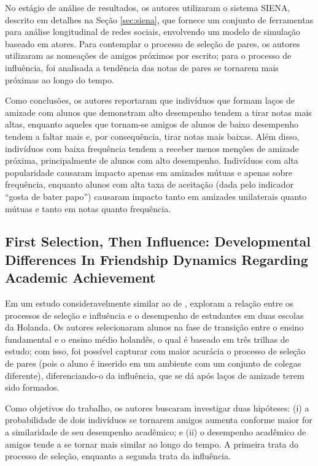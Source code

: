 No estágio de análise de resultados, os autores utilizaram o sistema SIENA, descrito em detalhes na Seção \ref{sec:siena}, que fornece um conjunto de ferramentas para análise longitudinal de redes sociais, envolvendo um modelo de simulação baseado em atores. Para contemplar o processo de seleção de pares, os autores utilizaram as nomeações de amigos próximos por escrito; para o processo de influência, foi analisada a tendência das notas de pares se tornarem mais próximas ao longo do tempo.

Como conclusões, os autores reportaram que indivíduos que formam laços de amizade com alunos que demonstram alto desempenho tendem a tirar notas mais altas, enquanto aqueles que tornam-se amigos de alunos de baixo desempenho tendem a faltar mais e, por consequência, tirar notas mais baixas. Além disso, indivíduos com baixa frequência tendem a receber menos menções de amizade próxima, principalmente de alunos com alto desempenho. Indivíduos com alta popularidade causaram impacto apenas em amizades mútuas e apenas sobre frequência, enquanto alunos com alta taxa de aceitação (dada pelo indicador ``gosta de bater papo'') causaram impacto tanto em amizades unilaterais quanto mútuas e tanto em notas quanto frequência.

\subsection{First Selection, Then Influence: Developmental Differences In Friendship Dynamics Regarding Academic Achievement} \label{sec:gremmen}

Em um estudo consideravelmente similar ao de ,  exploram a relação entre os processos de seleção e influência e o desempenho de estudantes em duas escolas da Holanda. Os autores selecionaram alunos na fase de transição entre o ensino fundamental e o ensino médio holandês, o qual é baseado em três trilhas de estudo; com isso, foi possível capturar com maior acurácia o processo de seleção de pares (pois o aluno é inserido em um ambiente com um conjunto de colegas diferente), diferenciando-o da influência, que se dá após laços de amizade terem sido formados.

Como objetivos do trabalho, os autores buscaram investigar duas hipóteses: (i) a probabilidade de dois indivíduos se tornarem amigos aumenta conforme maior for a similaridade de seu desempenho acadêmico; e (ii) o desempenho acadêmico de amigos tende a se tornar mais similar ao longo do tempo. A primeira trata do processo de seleção, enquanto a segunda trata da influência.

